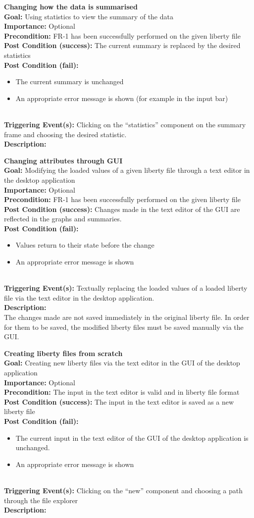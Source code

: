 \documentclass[10pt,a4paper]{report}
\newcommand{\FRODescription}[8]{
    \textbf{#1} \\
    \textbf{Goal: } #2 \\
    \textbf{Importance: } #3 \\
    \textbf{Precondition: } #4 \\
    \textbf{Post Condition (success): } #5 \\
    \textbf{Post Condition (fail): } #6 \\
    \textbf{Triggering Event(s): } #7 \\
    \textbf{Description: } \\ 
    #8}
\begin{document}
\begin{FRO}
    \item \FRODescription{Changing how the data is summarised}
    {Using statistics to view the summary of the data}
    {Optional}
    {FR-1 has been successfully performed on the given liberty file}
    {The current summary is replaced by the desired statistics}
    {\begin{itemize}
        \item The current summary is unchanged
        \item An appropriate error message is shown (for example in the input bar)
    \end{itemize}}
    {Clicking on the “statistics” component on the summary frame and choosing the desired statistic.}
    \item \FRODescription{Changing attributes through GUI}
    {Modifying the loaded values of a given liberty file through a text editor in the desktop application}
    {Optional}
    {FR-1 has been successfully performed on the given liberty file}
    {Changes made in the text editor of the GUI are reflected in the graphs and summaries.}
    {\begin{itemize}
        \item Values return to their state before the change
        \item An appropriate error message is shown
    \end{itemize}}
    {Textually replacing the loaded values of a loaded liberty file via the text editor in the desktop application.}
    {The changes made are not saved immediately in the original liberty file. In order for them to be saved, the modified liberty files must be saved manually via the GUI.}
    \item \FRODescription{Creating liberty files from scratch}
    {Creating new liberty files via the text editor in the GUI of the desktop application}
    {Optional}
    {The input in the text editor is valid and in liberty file format}
    {The input in the text editor is saved as a new liberty file}
    {\begin{itemize}
        \item The current input in the text editor of the GUI of the desktop application is unchanged.
        \item An appropriate error message is shown
    \end{itemize}}
    {Clicking on the “new” component and choosing a path through the file explorer}
    \item {}

\end{FRO}
\end{document}
